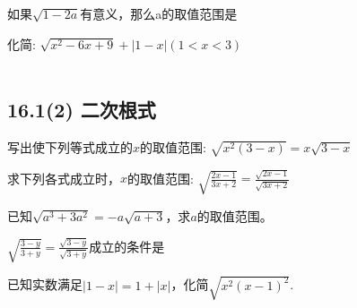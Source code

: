 \documentclass[answers]{exam}
\begin{document}
\begin{questions}

\question 如果$\sqrt{1-2a}$有意义，那么a的取值范围是\underline{\quad\quad}

\question 化简: $\sqrt{x^2-6x+9} + \left| 1-x \right| (1<x<3)$
  ~\\
  ~\\

\end{questions}

\subsection{16.1(2) 二次根式}

\begin{questions}

  \question
  写出使下列等式成立的$x$的取值范围: $\sqrt{x^2(3-x)}=x \sqrt{3-x}$

  \question
  求下列各式成立时，$x$的取值范围: $\sqrt{\frac{2x-1}{3x+2}}=\frac{\sqrt{2x-1}}{\sqrt{3x+2}}$
  
  \question
  已知$\sqrt{a^3+3a^2}=-a\sqrt{a+3}$，求$a$的取值范围。

  \question
  $\sqrt{\frac{3-y}{3+y}}=\frac{\sqrt{3-y}}{\sqrt{3+y}}$成立的条件是\underline{\quad\quad}

\question 已知实数满足$|1-x|=1+|x|$，化简$\sqrt{x^2(x-1)^2}$.

\end{questions}
\end{document}
